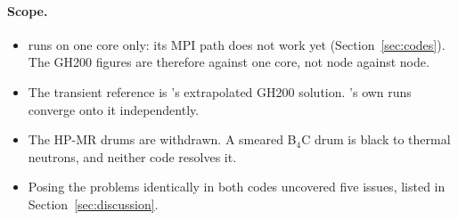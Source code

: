 \paragraph{Scope.}
\begin{itemize}
\item \ffn{} runs on one core only: its MPI path does not work yet
  (Section~\ref{sec:codes}). The GH200 figures are therefore against one
  core, not node against node.
\item The transient reference is \garnet's extrapolated GH200 solution.
  \ffn's own runs converge onto it independently.
\item The HP-MR drums are withdrawn. A smeared B$_4$C drum is black to
  thermal neutrons, and neither code resolves it.
\item Posing the problems identically in both codes uncovered five \ffn{}
  issues, listed in Section~\ref{sec:discussion}.
\end{itemize}
